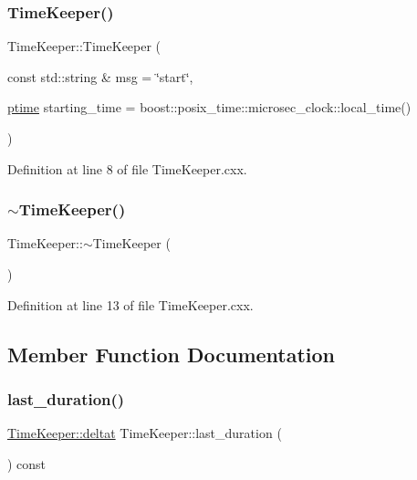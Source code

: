 \subsubsection{\texorpdfstring{Time\+Keeper()}{TimeKeeper()}}
{\footnotesize\ttfamily Time\+Keeper\+::\+Time\+Keeper (\begin{DoxyParamCaption}\item[{const std\+::string \&}]{msg = {\ttfamily \char`\"{}start\char`\"{}},  }\item[{\hyperlink{class_wire_cell_1_1_time_keeper_a3600404e97a1581a1c2630f92f490603}{ptime}}]{starting\+\_\+time = {\ttfamily boost\+:\+:posix\+\_\+time\+:\+:microsec\+\_\+clock\+:\+:local\+\_\+time()} }\end{DoxyParamCaption})}



Definition at line 8 of file Time\+Keeper.\+cxx.

\mbox{\label{class_wire_cell_1_1_time_keeper_aba1d443fcfdba702f0e28031bcad98c8}} 
\subsubsection{\texorpdfstring{$\sim$\+Time\+Keeper()}{~TimeKeeper()}}
{\footnotesize\ttfamily Time\+Keeper\+::$\sim$\+Time\+Keeper (\begin{DoxyParamCaption}{ }\end{DoxyParamCaption})}



Definition at line 13 of file Time\+Keeper.\+cxx.



\subsection{Member Function Documentation}
\mbox{\label{class_wire_cell_1_1_time_keeper_aaa411313dc1302f83db8a880b6bbd719}} 
\subsubsection{\texorpdfstring{last\+\_\+duration()}{last\_duration()}}
{\footnotesize\ttfamily \hyperlink{class_wire_cell_1_1_time_keeper_a3e7203525811fc9902aab31615d18ad2}{Time\+Keeper\+::deltat} Time\+Keeper\+::last\+\_\+duration (\begin{DoxyParamCaption}{ }\end{DoxyParamCaption}) const}



